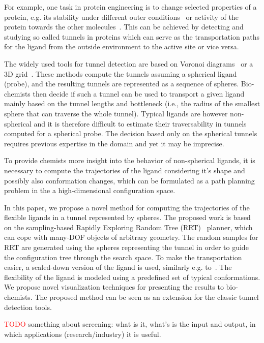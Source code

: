 \documentclass{svmult}
\newcommand{\red}[1]{\textcolor{red}{#1}}
\begin{document}
For example, one task in protein engineering is to change selected properties of a protein, e.g. its stability under different outer conditions~\cite{Koudelakova2013} or activity of the protein towards the other molecules~\cite{Pavlova2009}.
This can be achieved by detecting and studying so called tunnels in proteins which can serve as the transportation paths for the 
ligand from the outside environment to the active site or vice versa. 

The widely used tools for tunnel detection are based on Voronoi diagrams~\cite{yaffe2008,caver3} or 
a 3D grid~\cite{sehnal2013mole,petrek2006caver}.
These methods compute the tunnels assuming a spherical ligand (probe), and the resulting tunnels are represented as a sequence of spheres.
Bio-chemists then decide if such a tunnel can be used to transport a given ligand mainly based on the tunnel lengths and bottleneck (i.e.,
        the radius of the smallest sphere that can traverse the whole tunnel).
Typical ligands are however non-spherical and it is therefore difficult to estimate their traversability in tunnels computed for a spherical probe.
The decision based only on the spherical tunnels requires previous expertise in the domain and yet it may be imprecise.

To provide chemists more insight into the behavior of non-spherical ligands, it is necessary to compute the trajectories of the ligand considering it's shape and possibly also conformation changes, which can be formulated as a path planning problem in the a high-dimensional configuration space.

In this paper, we propose a novel method for computing the trajectories of the flexible ligands in a tunnel represented by spheres.
The proposed work is based on the sampling-based Rapidly Exploring Random Tree (RRT)~\cite{lavalleRRT} planner, which
can cope with many-DOF objects of arbitrary geometry.
The random samples for RRT are generated using the spheres representing the tunnel in order to guide the configuration tree through the search space.
To make the transportation easier, a scaled-down version of the ligand is used, similarly e.g. to~\cite{cortes2005path}.
The flexibility of the ligand is modeled using a predefined set of typical conformations.
We propose novel visualization techniques for presenting the results to bio-chemists.
The proposed method can be seen as an extension for the classic tunnel detection tools.

\red{TODO}
something about screening: what is it, what's is the input and output, in which applications (research/industry) it is useful.
\end{document}
